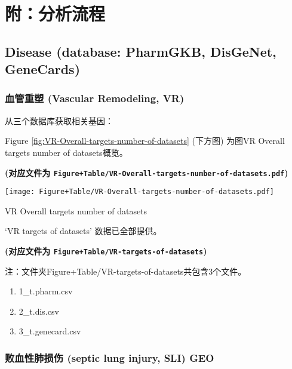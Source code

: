 \documentclass[
]{article}
\providecommand{\tightlist}{%
  \setlength{\itemsep}{0pt}\setlength{\parskip}{0pt}}
\begin{document}
\hypertarget{workflow}{%
\section{附：分析流程}\label{workflow}}

\hypertarget{disease-database-pharmgkb-disgenet-genecards}{%
\subsection{Disease (database: PharmGKB, DisGeNet, GeneCards)}\label{disease-database-pharmgkb-disgenet-genecards}}

\hypertarget{vr}{%
\subsubsection{血管重塑 (Vascular Remodeling, VR)}\label{vr}}

从三个数据库获取相关基因：

Figure \ref{fig:VR-Overall-targets-number-of-datasets} (下方图) 为图VR Overall targets number of datasets概览。

\textbf{(对应文件为 \texttt{Figure+Table/VR-Overall-targets-number-of-datasets.pdf})}

\def\@captype{figure}
\begin{center}
\texttt{[image: Figure+Table/VR-Overall-targets-number-of-datasets.pdf]}
\caption{VR Overall targets number of datasets}\label{fig:VR-Overall-targets-number-of-datasets}
\end{center}

`VR targets of datasets' 数据已全部提供。

\textbf{(对应文件为 \texttt{Figure+Table/VR-targets-of-datasets})}

\begin{center}\begin{tcolorbox}[colback=gray!10, colframe=gray!50, width=0.9\linewidth, arc=1mm, boxrule=0.5pt]注：文件夹Figure+Table/VR-targets-of-datasets共包含3个文件。

\begin{enumerate}\tightlist
\item 1\_t.pharm.csv
\item 2\_t.dis.csv
\item 3\_t.genecard.csv
\end{enumerate}\end{tcolorbox}
\end{center}

\hypertarget{sli}{%
\subsubsection{败血性肺损伤 (septic lung injury, SLI) GEO}\label{sli}}
\end{document}
